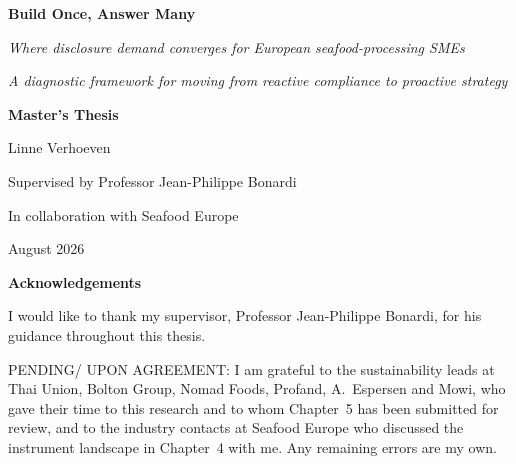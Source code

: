 \documentclass[
]{article}
\author{}
\date{}
\begin{document}
\setlength{\LTleft}{\fill}\setlength{\LTright}{\fill} %

\begin{titlepage}
  \centering
  \vspace*{4cm}

  {\LARGE\textbf{Build Once, Answer Many}\par}
  \vspace{1cm}
  {\large\emph{Where disclosure demand converges for European seafood-processing SMEs}\par}
  \vspace{0.5cm}
  {\large\emph{A diagnostic framework for moving from reactive compliance to proactive strategy}\par}
  \vspace{2cm}
  {\large\textbf{Master's Thesis}\par}
  \vspace{1.5cm}
  {\large Linne Verhoeven\par}
  \vspace{0.8cm}
  {\large Supervised by Professor Jean-Philippe Bonardi\par}
  \vspace{0.4cm}
  {\large In collaboration with Seafood Europe\par}
  \vspace{1.2cm}
  {\large August 2026\par}
\end{titlepage}

\thispagestyle{empty}
\vspace*{2cm}
\begin{center}
{\Large\textbf{Acknowledgements}}
\end{center}
\vspace{1cm}
\noindent
I would like to thank my supervisor, Professor Jean-Philippe Bonardi, for his
guidance throughout this thesis.

PENDING/ UPON AGREEMENT: I am grateful to the sustainability leads at Thai Union, Bolton Group, Nomad
Foods, Profand, A.~Espersen and Mowi, who gave their time to this research and
to whom Chapter~5 has been submitted for review,
and to the industry contacts at Seafood Europe who discussed the instrument
landscape in Chapter~4 with me. Any remaining errors are my own.
\end{document}
